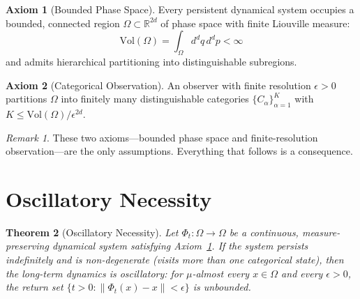 \documentclass[twocolumn,10pt,a4paper]{article}
\theoremstyle{plain}
\newtheorem{theorem}{Theorem}[section]
\theoremstyle{definition}
\newtheorem{axiom}{Axiom}
\theoremstyle{remark}
\newtheorem{remark}[theorem]{Remark}
\begin{document}
\begin{axiom}[Bounded Phase Space]
\label{ax:bounded}
Every persistent dynamical system occupies a bounded, connected region $\Omega \subset \mathbb{R}^{2d}$ of phase space with finite Liouville measure:
\begin{equation}
    \mathrm{Vol}(\Omega) = \int_\Omega d^d q\, d^d p < \infty
\end{equation}
and admits hierarchical partitioning into distinguishable subregions.
\end{axiom}

\begin{axiom}[Categorical Observation]
\label{ax:categorical}
An observer with finite resolution $\epsilon > 0$ partitions $\Omega$ into finitely many distinguishable categories $\{C_\alpha\}_{\alpha=1}^{K}$ with $K \leq \mathrm{Vol}(\Omega)/\epsilon^{2d}$.
\end{axiom}

\begin{remark}
These two axioms---bounded phase space and finite-resolution observation---are the only assumptions. Everything that follows is a consequence.
\end{remark}

\section{Oscillatory Necessity}
\label{sec:oscillatory}

\begin{theorem}[Oscillatory Necessity]
\label{thm:oscillatory}
Let $\Phi_t : \Omega \to \Omega$ be a continuous, measure-preserving dynamical system satisfying Axiom~\ref{ax:bounded}. If the system persists indefinitely and is non-degenerate (visits more than one categorical state), then the long-term dynamics is oscillatory: for $\mu$-almost every $x \in \Omega$ and every $\epsilon > 0$, the return set $\{t > 0 : \|\Phi_t(x) - x\| < \epsilon\}$ is unbounded.
\end{theorem}
\end{document}

